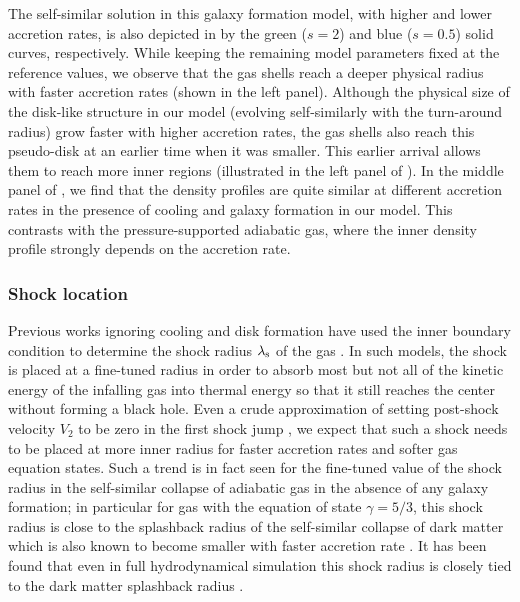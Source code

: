 The self-similar solution in this galaxy formation model, with higher and lower accretion rates, is also depicted in  by the green ($s=2$) and blue ($s=0.5$) solid curves, respectively. While keeping the remaining model parameters fixed at the reference values, we observe that the gas shells reach a deeper physical radius with faster accretion rates (shown in the left panel). Although the physical size of the disk-like structure in our model (evolving self-similarly with the turn-around radius) grow faster with higher accretion rates, the gas shells also reach this pseudo-disk at an earlier time when it was smaller. This earlier arrival allows them to reach more inner regions (illustrated in the left panel of ). In the middle panel of , we find that the density profiles are quite similar at different accretion rates in the presence of cooling and galaxy formation in our model. This contrasts with the pressure-supported adiabatic gas, where the inner density profile strongly depends on the accretion rate.





\subsubsection{Shock location}
Previous works ignoring cooling and disk formation have used the inner boundary condition to determine the shock radius $\lambda_{\rm s}$ of the gas \cite{1985Bertschinger}. In such models, the shock is placed at a fine-tuned radius in order to absorb most but not all of the kinetic energy of the infalling gas into thermal energy so that it still reaches the center without forming a black hole. Even a crude approximation of setting post-shock velocity $V_2$ to be zero in the first shock jump , we expect that such a shock needs to be placed at more inner radius for faster accretion rates and softer gas equation states. Such a trend is in fact seen for the fine-tuned value of the shock radius in the self-similar collapse of adiabatic gas in the absence of any galaxy formation; in particular for gas with the equation of state $\gamma=5/3$, this shock radius is close to the splashback radius of the self-similar collapse of dark matter which is also known to become smaller with faster accretion rate \cite{2016ShiICM}. It has been found that even in full hydrodynamical simulation this shock radius is closely tied to the dark matter splashback radius \cite{2015LauNagaietal}.

